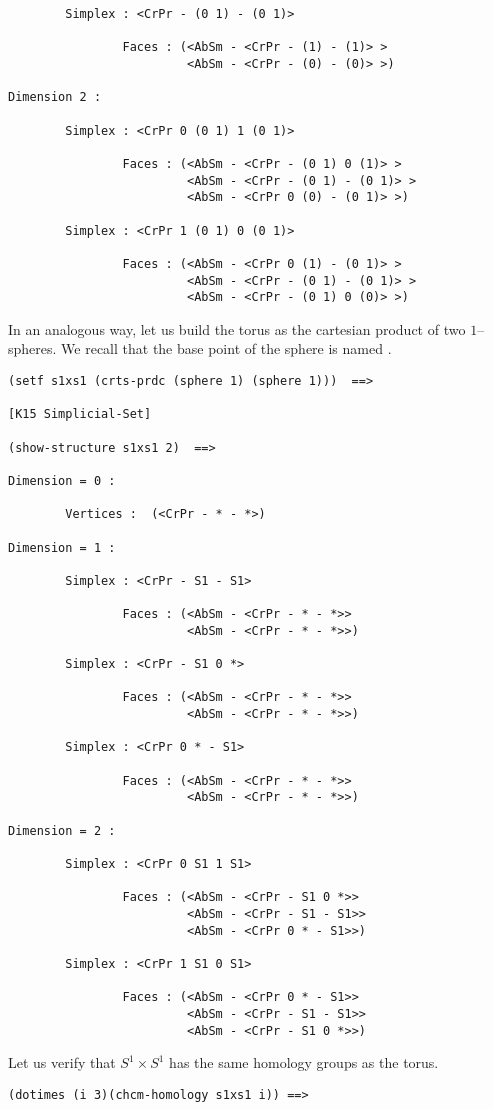 {{\begin{verbatim}
        Simplex : <CrPr - (0 1) - (0 1)>

                Faces : (<AbSm - <CrPr - (1) - (1)> >
                         <AbSm - <CrPr - (0) - (0)> >)

Dimension 2 :

        Simplex : <CrPr 0 (0 1) 1 (0 1)>

                Faces : (<AbSm - <CrPr - (0 1) 0 (1)> >
                         <AbSm - <CrPr - (0 1) - (0 1)> >
                         <AbSm - <CrPr 0 (0) - (0 1)> >)

        Simplex : <CrPr 1 (0 1) 0 (0 1)>

                Faces : (<AbSm - <CrPr 0 (1) - (0 1)> >
                         <AbSm - <CrPr - (0 1) - (0 1)> >
                         <AbSm - <CrPr - (0 1) 0 (0)> >)
\end{verbatim}}
In an analogous way, let us build the torus as the cartesian product
of two $1$--spheres. We recall that the base point of the sphere is named {\tt *}.
{\footnotesize\begin{verbatim}
(setf s1xs1 (crts-prdc (sphere 1) (sphere 1)))  ==>

[K15 Simplicial-Set]

(show-structure s1xs1 2)  ==>

Dimension = 0 :

        Vertices :  (<CrPr - * - *>)

Dimension = 1 :

        Simplex : <CrPr - S1 - S1>

                Faces : (<AbSm - <CrPr - * - *>>
                         <AbSm - <CrPr - * - *>>)

        Simplex : <CrPr - S1 0 *>

                Faces : (<AbSm - <CrPr - * - *>>
                         <AbSm - <CrPr - * - *>>)

        Simplex : <CrPr 0 * - S1>

                Faces : (<AbSm - <CrPr - * - *>>
                         <AbSm - <CrPr - * - *>>)

Dimension = 2 :

        Simplex : <CrPr 0 S1 1 S1>

                Faces : (<AbSm - <CrPr - S1 0 *>>
                         <AbSm - <CrPr - S1 - S1>>
                         <AbSm - <CrPr 0 * - S1>>)

        Simplex : <CrPr 1 S1 0 S1>

                Faces : (<AbSm - <CrPr 0 * - S1>>
                         <AbSm - <CrPr - S1 - S1>>
                         <AbSm - <CrPr - S1 0 *>>)
\end{verbatim}}
Let us verify that  $S^1\times S^1$ has  the same  homology groups as the torus.
{\footnotesize\begin{verbatim}
(dotimes (i 3)(chcm-homology s1xs1 i)) ==>
  

\end{verbatim}}}
